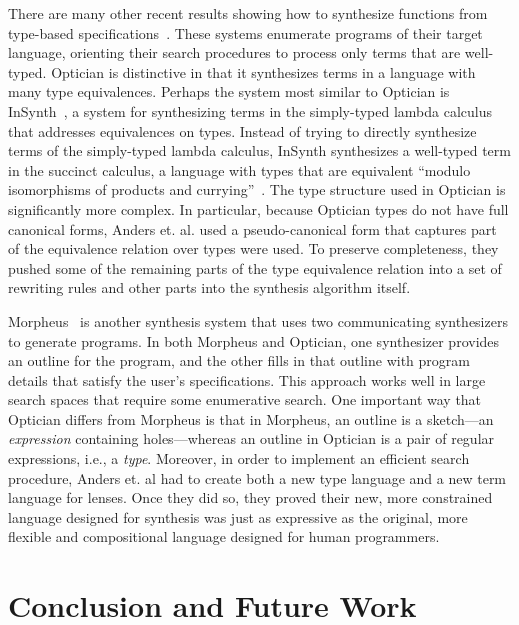 \documentclass[acmsmall,review,anonymous]{acmart}
\begin{document}
There are many other recent results showing how to synthesize functions from
type-based
specifications~\cite{augustsson-2004,osera+:pldi15,feser-pldi-2015,scherer-icfp-2015,frankle+:popl16,armando+:pldi16}.
These systems enumerate programs of their target language, orienting their
search procedures to process only terms that are well-typed.
Optician is distinctive in that it synthesizes terms in a language with many
type equivalences. Perhaps the system most similar to Optician is
InSynth~\cite{gvero-pldi-2013}, a system for synthesizing terms in the
simply-typed lambda calculus that addresses equivalences on types. Instead of
trying to directly synthesize terms of the simply-typed lambda calculus,
InSynth synthesizes a well-typed term in the succinct calculus, a language with
types that are equivalent ``modulo isomorphisms of products and
currying''~\cite{gvero-pldi-2013}. The type structure used in Optician
is significantly more complex.  In particular, because Optician types do not
have full canonical forms, Anders et. al. used a pseudo-canonical form that
captures part of the equivalence relation over types were used. To preserve
completeness, they pushed some of the remaining parts of the type equivalence
relation into a set of rewriting rules and other parts into the synthesis
algorithm itself.

Morpheus~\cite{morpheus} is another synthesis system that uses two
communicating synthesizers to generate programs.  In both Morpheus and
Optician, one synthesizer provides an outline for the program, and the other
fills in that outline with program details that satisfy the user's
specifications. This approach works well in large search spaces that require
some enumerative search. One important way that Optician differs from Morpheus
is that in Morpheus, an outline is a sketch---an \emph{expression}
containing holes---whereas an outline in Optician is a pair of regular
expressions, i.e., a \emph{type}.  Moreover, in order to implement an efficient
search procedure, Anders et. al had to create both a new type language and a new
term language for lenses.  Once they did so, they proved their new, more
constrained language designed for synthesis was just as expressive as the
original, more flexible and compositional language designed for human
programmers.

\section{Conclusion and Future Work}
\label{concl}
\end{document}
